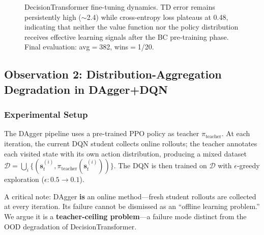 \documentclass[11pt,a4paper]{article}
\theoremstyle{definition}
\begin{document}
\begin{figure}[ht]
\centering
{}
\caption{DecisionTransformer fine-tuning dynamics. TD error remains persistently high ($\sim$2.4) while cross-entropy loss plateaus at 0.48, indicating that neither the value function nor the policy distribution receives effective learning signals after the BC pre-training phase. Final evaluation: avg$=$382, wins$=$1/20.}
\label{fig:dt-curves}
\end{figure}

\subsection{Observation 2: Distribution-Aggregation Degradation in DAgger+DQN}

\subsubsection{Experimental Setup}

The DAgger pipeline uses a pre-trained PPO policy as teacher $\pi_{\text{teacher}}$.
At each iteration, the current DQN student collects online rollouts; the teacher annotates each visited state with its own action distribution, producing a mixed dataset $\mathcal{D} = \bigcup_i \{(\mathbf{s}_t^{(i)}, \pi_{\text{teacher}}(\mathbf{s}_t^{(i)}))\}$.
The DQN is then trained on $\mathcal{D}$ with $\epsilon$-greedy exploration ($\epsilon: 0.5 \to 0.1$).

A critical note: DAgger \textbf{is} an online method---fresh student rollouts are collected at every iteration.
Its failure cannot be dismissed as an ``offline learning problem.''
We argue it is a \textbf{teacher-ceiling problem}---a failure mode distinct from the OOD degradation of DecisionTransformer.
\end{document}
